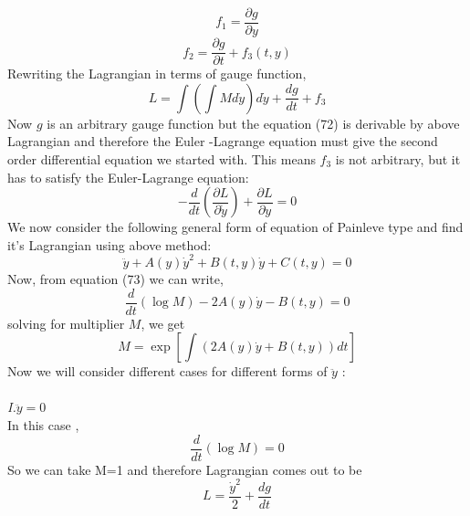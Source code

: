 \documentclass[14pt]{extarticle}
\begin{document}
\begin{equation}
f_{1}=\frac{\partial g}{\partial y}
\end{equation}
\begin{equation}
f_{2}=\frac{\partial g}{\partial t}+f_{3}(t, y)
\end{equation}
Rewriting the Lagrangian in terms of gauge function, \\
\begin{equation}
L=\int\left(\int M d \dot{y}\right) d \dot{y}+\frac{d g}{d t}+f_{3}
\end{equation}
Now $g$ is an arbitrary gauge function but the equation (72) is derivable by above Lagrangian and therefore the Euler -Lagrange equation must give the second order differential equation we started with. This means $f_{3}$ is not arbitrary, but it has to satisfy the Euler-Lagrange equation:\\
\begin{equation}
-\frac{d}{d t}\left(\frac{\partial L}{\partial \dot{y}}\right)+\frac{\partial L}{\partial y}=0
\end{equation}
We now consider the following general form of equation of Painleve type and  find it's Lagrangian using above method:\\
\begin{equation}
\ddot{y}+A(y) \dot{y}^{2}+B(t, y) \dot{y}+C(t, y)=0
\end{equation}
Now, from equation (73) we can write,\\
\begin{equation}
\frac{d}{d t}(\log M)-2 A(y) \dot{y}-B(t, y)=0
\end{equation}
solving for multiplier $M$, we get \\
\begin{equation}
M=\exp \left[\int(2 A(y) \dot{y}+B(t, y)) d t\right]
\end{equation}   
Now we will consider different cases for different forms of $\ddot{y}$ :\\ \\
\textit{I.$\ddot{y}=0$} \\
In this case ,\\
\begin{equation}
\frac{d}{d t}(\log M)=0
\end{equation}
So we can take M=1 and therefore Lagrangian comes out to be \\
\begin{equation}
L=\frac{\dot{y}^{2}}{2}+\frac{d g}{d t}
\end{equation}\\ 
\end{document}
